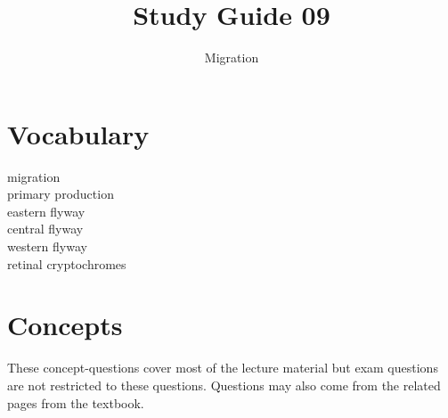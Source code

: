 \documentclass[nofonts, letterpaper]{tufte-handout}
\title{Study Guide 09}
\author{Migration}
\date{} %
\begin{document}
\maketitle	%


\section{Vocabulary}
\vspace{-1\baselineskip}
\begin{multicols}{2}
migration \\
primary production \\
eastern flyway \\
central flyway \\
western flyway \\
retinal cryptochromes 
\end{multicols}

\section{Concepts}

These concept-questions cover most of the lecture material but exam questions are not restricted to these questions. Questions may also come from the related pages from the textbook.\vspace{\baselineskip}
\end{document}
